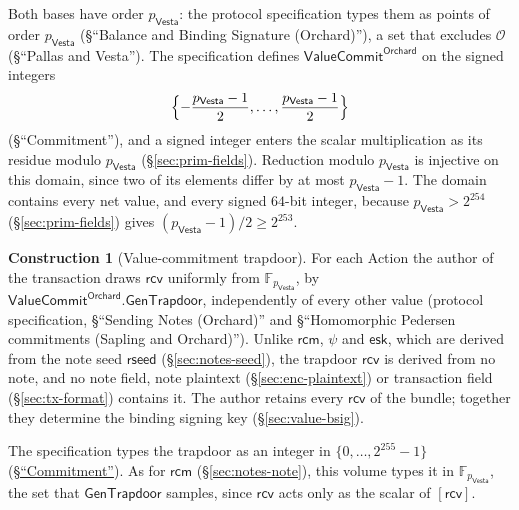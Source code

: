 \documentclass[11pt,a4paper]{article}
\theoremstyle{definition}
\newtheorem{construction}[theorem]{Construction}
\newcommand{\F}{\mathbb{F}}
\newcommand{\Vesta}{\ensuremath{\mathsf{Vesta}}}
\newcommand{\rcv}{\ensuremath{\mathsf{rcv}}}
\newcommand{\rcm}{\ensuremath{\mathsf{rcm}}}
\begin{document}
Both bases have order $p_{\Vesta}$: the protocol specification types them as
points of order $p_{\Vesta}$ (\S``Balance and Binding Signature
(Orchard)''), a set that excludes $\mathcal{O}$ (\S``Pallas and Vesta'').
The specification defines $\mathsf{ValueCommit}^{\mathsf{Orchard}}$ on the
signed integers
\[
  \Bigl\{-\frac{p_{\Vesta} - 1}{2}, \dots, \frac{p_{\Vesta} - 1}{2}\Bigr\}
\]
(\S``Commitment''), and a signed integer enters the scalar multiplication
as its residue modulo $p_{\Vesta}$ (\S\ref{sec:prim-fields}). Reduction
modulo $p_{\Vesta}$ is injective on this domain, since two of its elements
differ by at most $p_{\Vesta} - 1$. The domain contains every net value, and
every signed $64$-bit integer, because $p_{\Vesta} > 2^{254}$
(\S\ref{sec:prim-fields}) gives $(p_{\Vesta} - 1)/2 \ge 2^{253}$.

\begin{construction}[Value-commitment trapdoor]
For each Action the author of the transaction draws $\rcv$ uniformly from
$\F_{p_{\Vesta}}$, by $\mathsf{ValueCommit}^{\mathsf{Orchard}}.
\mathsf{GenTrapdoor}$, independently of every other value (protocol
specification, \S``Sending Notes (Orchard)'' and \S``Homomorphic Pedersen
commitments (Sapling and Orchard)''). Unlike $\rcm$, $\psi$ and
$\mathsf{esk}$, which are derived from the note seed $\mathsf{rseed}$
(\S\ref{sec:notes-seed}), the trapdoor $\rcv$ is derived from no note, and no
note field, note plaintext (\S\ref{sec:enc-plaintext}) or transaction field
(\S\ref{sec:tx-format}) contains it. The author retains every $\rcv$ of the
bundle; together they determine the binding signing key
(\S\ref{sec:value-bsig}).
\end{construction}

The specification types the trapdoor as an integer in
$\{0, \dots, 2^{255} - 1\}$
(\href{https://zips.z.cash/protocol/protocol.pdf#abstractcommit}%
{\S``Commitment''}). As for $\rcm$
(\S\ref{sec:notes-note}), this volume types it in $\F_{p_{\Vesta}}$, the
set that $\mathsf{GenTrapdoor}$ samples, since $\rcv$ acts only as the scalar
of $[\rcv]$.
\end{document}
